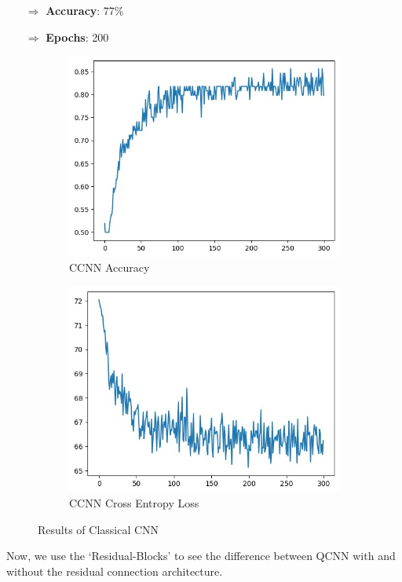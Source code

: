 \documentclass[a4paper]{article}
\begin{document}
\begin{itemize}
\item[$\Rightarrow$] \textbf{Accuracy}: 77\%
\item[$\Rightarrow$] \textbf{Epochs}: 200
\end{itemize}
\newpage

\begin{figure}[h]
\centering
\begin{subfigure}{.5\textwidth}
  \centering
  \includegraphics[height=0.7\linewidth]{assets/accu.jpeg}
  \caption{CCNN Accuracy}
  \label{fig:sub1}
\end{subfigure}%
\begin{subfigure}{.5\textwidth}
  \centering
  \includegraphics[height=.7\linewidth]{assets/cf.jpeg}
  \caption{CCNN Cross Entropy Loss}
  \label{fig:sub2}
\end{subfigure}%
\caption{Results of Classical CNN}
\label{fig:test}
\end{figure}
Now, we use the `Residual-Blocks' to see the difference between QCNN with and without the residual connection architecture.
\end{document}
